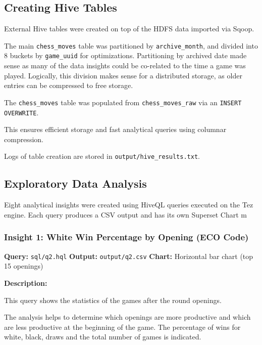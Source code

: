 \documentclass[12pt,a4paper]{article}
\begin{document}
\subsection{Creating Hive Tables}

External Hive tables were created on top of the HDFS data imported via Sqoop.

The main \texttt{chess\_moves} table was partitioned by \texttt{archive\_month}, and divided into 8 buckets by \texttt{game\_uuid} for optimizations. Partitioning by archived date made sense as many of the data insights could be co-related to the time a game was played. Logically, this division makes sense for a distributed storage, as older entries can be compressed to free storage.

The \texttt{chess\_moves} table was populated from \texttt{chess\_moves\_raw} via an \texttt{INSERT OVERWRITE}.

This ensures efficient storage and fast analytical queries using columnar compression.

Logs of table creation are stored in \texttt{output/hive\_results.txt}.

\subsection{Exploratory Data Analysis}

Eight analytical insights were created using HiveQL queries executed on the Tez engine. Each query produces a CSV output and has its own Superset Chart
  m


\newpage
\subsubsection{Insight 1: White Win Percentage by Opening (ECO Code)}

\textbf{Query:} \texttt{sql/q2.hql}  
\textbf{Output:} \texttt{output/q2.csv}  
\textbf{Chart:} Horizontal bar chart (top 15 openings)

\textbf{Description:}

This query shows the statistics of the games after the round openings.

The analysis helps to determine which openings are more productive and which are less productive at the beginning of the game. The percentage of wins for white, black, draws and the total number of games is indicated.
\end{document}
